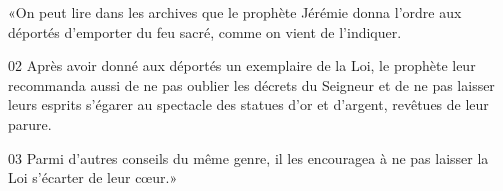 «On peut lire dans les archives que le prophète Jérémie donna l’ordre aux déportés d’emporter du feu sacré, comme on vient de l’indiquer.

02 Après avoir donné aux déportés un exemplaire de la Loi, le prophète leur recommanda aussi de ne pas oublier les décrets du Seigneur et de ne pas laisser leurs esprits s’égarer au spectacle des statues d’or et d’argent, revêtues de leur parure.

03 Parmi d’autres conseils du même genre, il les encouragea à ne pas laisser la Loi s’écarter de leur cœur.»
